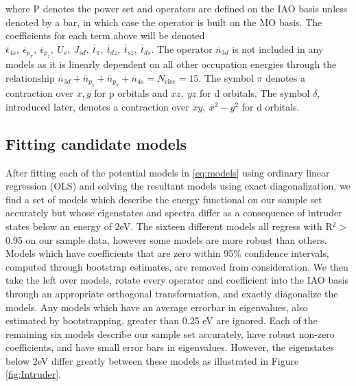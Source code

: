\documentclass{article}
\begin{document}
where P denotes the power set and operators are defined on the IAO basis unless denoted by a bar, in which case the operator is built on the MO basis. The coefficients for each term above will be denoted $\bar{\epsilon}_{4s},\ \bar{\epsilon}_{p_\pi},\ \bar{\epsilon}_{p_z},\ U_s,\ J_{sd},\ \bar{t}_\pi,\ \bar{t}_{dz},\ \bar{t}_{sz},\ \bar{t}_{ds}$. The operator $\bar{n}_{3d}$ is not included in any models as it is linearly dependent on all other occupation energies through the relationship $\bar{n}_{3d} + \bar{n}_{p_z} + \bar{n}_{p_\pi} + \bar{n}_{4s} = N_\text{elec} = \text{15}$. The symbol $\pi$ denotes a contraction over $x, y$ for p orbitals and $xz,\ yz$ for d orbitals. The symbol $\delta$, introduced later, denotes a contraction over $xy,\ x^2-y^2$ for d orbitals.

\pagebreak
\subsection{Fitting candidate models}
After fitting each of the potential models in \eqref{eq:models} using ordinary linear regression (OLS) and solving the resultant models using exact diagonalization, we find a set of models which describe the energy functional on our sample set accurately but whose eigenstates and spectra differ as a consequence of intruder states below an energy of 2eV. 
The sixteen different models all regress with R$^2 >$ 0.95 on our sample data, however some models are more robust than others. 
Models which have coefficients that are zero within 95\% confidence intervals, computed through bootstrap estimates, are removed from consideration.
We then take the left over models, rotate every operator and coefficient into the IAO basis through an appropriate orthogonal transformation, and exactly diagonalize the models.
Any models which have an average errorbar in eigenvalues, also estimated by bootstrapping, greater than 0.25 eV are ignored.
Each of the remaining six models describe our sample set accurately, have robust non-zero coefficients, and have small error bars in eigenvalues.
However, the eigenstates below 2eV differ greatly between these models as illustrated in Figure \ref{fig:Intruder}.
\end{document}
